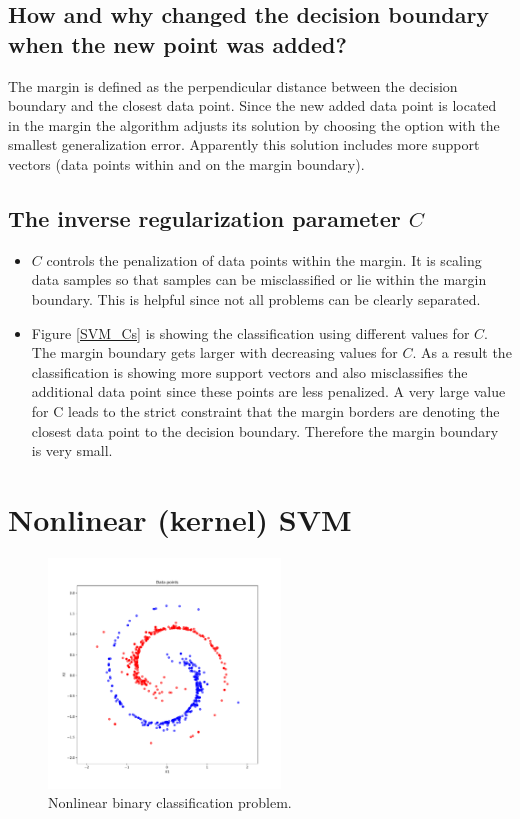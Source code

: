\documentclass{article}
\begin{document}
\subsection{How and why changed the decision boundary when the new point was added?}

The margin is defined as the perpendicular distance between the decision boundary and the closest data point. Since the new added data point is located in the margin the algorithm adjusts its solution by choosing the option with the smallest generalization error. Apparently this solution includes more support vectors (data points within and on the margin boundary).

\subsection{The inverse regularization parameter $C$}

\begin{itemize}

	\item $C$ controls the penalization of data points within the margin. It is scaling data samples so that samples can be misclassified or lie within the margin boundary. This is helpful since not all problems can be clearly separated.

	\item Figure \ref{SVM_Cs} is showing the classification using different values for $C$. The margin boundary gets larger with decreasing values for $C$. As a result the classification is showing more support vectors and also misclassifies the additional data point since these points are less penalized.
	    A very large value for C leads to the strict constraint that the margin borders are denoting the closest data point to the decision boundary. Therefore the margin boundary is very small.

\end{itemize}

\clearpage
\section{Nonlinear (kernel) SVM}

\begin{figure}[!ht]
\centering
\includegraphics[width=0.55\textwidth]{./Figures/2_data.pdf}
\caption{Nonlinear binary classification problem.}
\label{2_data}
\end{figure}
\end{document}
